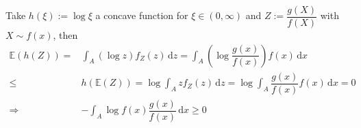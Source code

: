 \begin{itemize}
\begin{itemize}[topsep=2pt,itemsep=0pt]
        Take $ h(\xi ):=\log \xi  $ a concave function for $ \xi \in(0,\infty) $ and $ Z:=\dfrac{g(X)}{f(X)} $ with $ X\sim f(x) $, then
        \begin{align}
            \mathbb{E}\left( h(Z) \right) =&\int _A \left(\log z\right) f_Z(z) \,\mathrm{d}z=\int _A \left(\log \dfrac{g(x)}{f(x)}\right) f(x) \,\mathrm{d}x\\
            \leq &h(\mathbb{E}\left( Z \right) )=\log \int _A zf_Z(z) \,\mathrm{d}z=\log \int _A \dfrac{g(x)}{f(x)}f(x) \,\mathrm{d}x=0\\
            \Rightarrow& -\int _A \log f(x)\dfrac{g(x)}{f(x)} \,\mathrm{d}x\geq 0
        \end{align}
        
        

\end{itemize}
\end{itemize}
